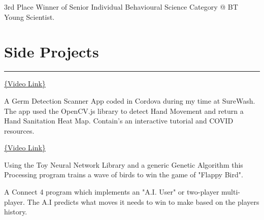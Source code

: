 \documentclass[]{rahulworld-resume}
\begin{document}
\begin{minipage}[t]{0.66\textwidth}
 
\descript{}
\noindent
\hspace{5em}%
\begin{minipage}{0.85\textwidth\vspace{2pt}}
3rd Place Winner of Senior Individual Behavioural Science Category @ BT Young Scientist. 
\end{minipage}
\section{Side Projects}
\noindent\rule{12.5cm}{0.4pt}
 \href{https://www.youtube.com/watch?v=t-JP8o0rwPQ}{\{Video Link\}}
\noindent
\begin{minipage}{1\textwidth\vspace{5pt}}
A Germ Detection Scanner App coded in Cordova during my time at SureWash. The app used the OpenCV.js library to detect Hand Movement and return a Hand Sanitation Heat Map. Contain's an interactive tutorial and COVID resources.


 
\end{minipage}


\href{https://www.youtube.com/watch?v=AWcNFv0VnSA&feature=youtu.be}{\{Video Link\}}
\noindent
\begin{minipage}{1\textwidth\vspace{5pt}}
Using the Toy Neural Network Library and a generic Genetic Algorithm this Processing program trains a wave of birds to win the game of "Flappy Bird".
\end{minipage}




\noindent
\begin{minipage}{1\textwidth\vspace{5pt}}
A Connect 4 program which implements an "A.I. User" or two-player multi-player. The A.I predicts what moves it needs to win to make based on the players history.
\end{minipage}








\end{minipage}
\end{document}
